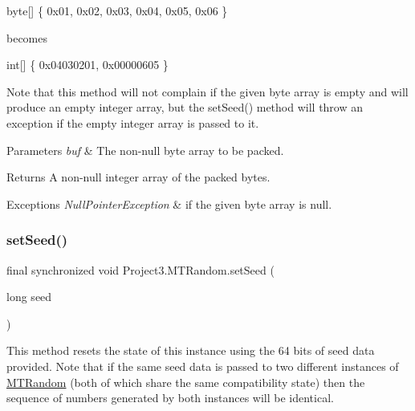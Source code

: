 \begin{DoxyPre}
byte[] \{ 0x01, 0x02, 0x03, 0x04, 0x05, 0x06 \}
\end{DoxyPre}


becomes


\begin{DoxyPre}
int[]  \{ 0x04030201, 0x00000605 \}
\end{DoxyPre}
 

Note that this method will not complain if the given byte array is empty and will produce an empty integer array, but the set\+Seed() method will throw an exception if the empty integer array is passed to it.


\begin{DoxyParams}{Parameters}
{\em buf} & The non-\/null byte array to be packed. \\
\hline
\end{DoxyParams}
\begin{DoxyReturn}{Returns}
A non-\/null integer array of the packed bytes. 
\end{DoxyReturn}

\begin{DoxyExceptions}{Exceptions}
{\em Null\+Pointer\+Exception} & if the given byte array is null. \\
\hline
\end{DoxyExceptions}
\mbox{\label{class_project3_1_1_m_t_random_a96cf558539a32642af9ae2fd51b0ad9f}} 
\subsubsection{\texorpdfstring{setSeed()}{setSeed()}\hspace{0.1cm}{\footnotesize\ttfamily [1/3]}}
{\footnotesize\ttfamily final synchronized void Project3.\+M\+T\+Random.\+set\+Seed (\begin{DoxyParamCaption}\item[{long}]{seed }\end{DoxyParamCaption})}

This method resets the state of this instance using the 64 bits of seed data provided. Note that if the same seed data is passed to two different instances of \mbox{\hyperlink{class_project3_1_1_m_t_random}{M\+T\+Random}} (both of which share the same compatibility state) then the sequence of numbers generated by both instances will be identical. 

